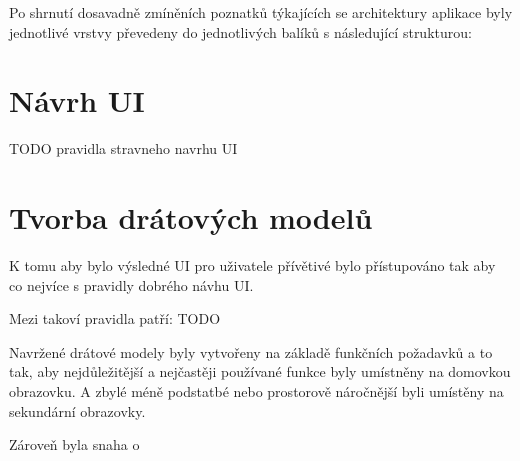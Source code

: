 \bigskip

Po shrnutí dosavadně zmíněních poznatků týkajících se architektury aplikace byly jednotlivé vrstvy převedeny do jednotlivých balíků s následující
strukturou:

\bigskip






\section{Návrh UI}

TODO pravidla stravneho navrhu UI

\section{Tvorba drátových modelů}
K tomu aby bylo výsledné UI pro uživatele přívětivé bylo přístupováno tak aby co nejvíce  s pravidly dobrého návhu UI.

Mezi takoví pravidla patří:
TODO

Navržené drátové modely byly vytvořeny na základě funkčních požadavků a to tak, aby nejdůležitější a nejčastěji používané funkce byly 
umístněny na domovkou obrazovku. A zbylé méně podstatbé nebo prostorově náročnější byli umístěny na sekundární obrazovky.

Zároveň byla snaha o 

\pagebreak


